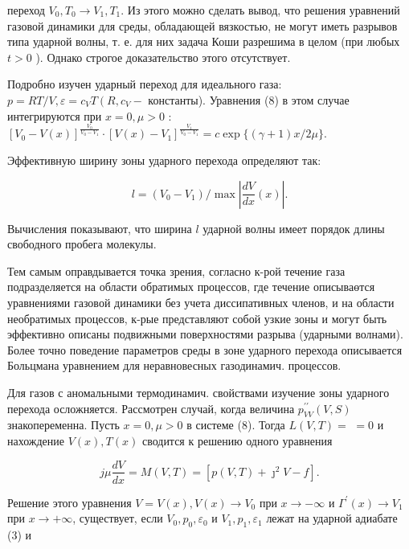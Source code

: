 \documentclass[10pt]{article}
\begin{document}
переход $V_{0}, T_{0} \rightarrow V_{1}, T_{1}$. Из этого можно сделать вывод, что решения уравнений газовой динамики для среды, обладающей вязкостью, не могут иметь разрывов типа ударной волны, т. е. для них задача Коши разрешима в целом (при любых $t>0$ ). Однако строгое доказательство этого отсутствует.



Подробно изучен ударный переход для идеального газа: $p=R T / V, \varepsilon=c_{V} T\left(R, c_{V}-\right.$ константы). Уравнения (8) в этом случае интегрируются при $x=0, \mu>0$ : $\left[V_{0}-V(x)\right]^{\frac{V_{0}}{V_{0}-V_{1}}} \cdot\left[V(x)-V_{1}\right]^{\frac{V_{1}}{V_{0}-V_{1}}}=c \exp \{(\gamma+1) x / 2 \mu\}$.



Эффективную ширину зоны ударного перехода определяют так:



\[

l=\left(V_{0}-V_{1}\right) / \max \left|\frac{d V}{d x}(x)\right| .

\]



Вычисления показывают, что ширина $l$ ударной волны имеет порядок длины свободного пробега молекулы.



Тем самым оправдывается точка зрения, согласно к-рой течение газа подразделяется на области обратимых процессов, где течение описываөтся уравнениями газовой динамики без учета диссипативных членов, и на области необратимых процессов, к-рые представляют собой узкие зоны и могут быть эффективно описаны подвижными поверхностями разрыва (ударными волнами). Более точно поведение параметров среды в зоне ударного перехода описывается Больцмана уравнением для неравновесных газодинамич. процессов.



Для газов с аномальными термодинамич. свойствами изучение зоны ударного перехода осложняется. Рассмотрен случай, когда величина $p_{V V}^{\prime \prime}(V, S)$ знакопеременна. Пусть $x=0, \mu>0$ в системе (8). Тогда $L(V, T)=$ $=0$ и нахождение $V(x), T(x)$ сводится к решению одного уравнения



\[

j \mu \frac{d V}{d x}=M(V, T)=\left[p(V, T)+\jmath^{2} V-f\right] .

\]



Решение этого уравнения $V=V(x), V(x) \rightarrow V_{0}$ при $x \rightarrow-\infty$ и $\Gamma^{\prime}(x) \rightarrow V_{1}$ при $x \rightarrow+\infty$, существует, если $V_{0}, p_{0}, \varepsilon_{0}$ и $V_{1}, p_{1}, \varepsilon_{1}$ лежат на ударной адиабате (3) и
\end{document}
